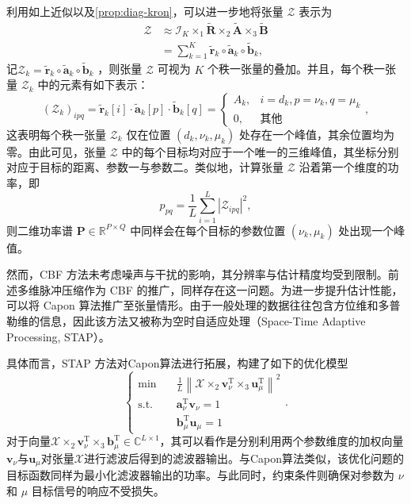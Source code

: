 利用如上近似以及\cref{prop:diag-kron}，可以进一步地将张量 \( \mathcal{Z} \) 表示为
\[
\begin{split}
    \mathcal{Z} 
    & \approx \mathcal{I}_K \times_1 \tilde{\mathbf{R}} \times_2 \tilde{\mathbf{A}} \times_3 \tilde{\mathbf{B}} \\
    & = \sum_{k=1}^K \tilde{\bm{r}}_k \circ \tilde{\bm{a}}_k \circ \tilde{\bm{b}}_k,
\end{split}
\]
记\( \mathcal{Z}_k = \tilde{\bm{r}}_k \circ \tilde{\bm{a}}_k \circ \tilde{\bm{b}}_k \) ，则张量 \( \mathcal{Z} \) 可视为 \( K \) 个秩一张量的叠加。并且，每个秩一张量 \( \mathcal{Z}_k \) 中的元素有如下表示：
\[
    (\mathcal{Z}_k)_{ipq} =  \tilde{\bm{r}}_k[i] \cdot \tilde{\bm{a}}_k[p] \cdot \tilde{\bm{b}}_k[q] = \begin{cases}
        A_k, & i = d_k, p = \nu_k, q = \mu_k \\
        0,   & \text{其他}
    \end{cases},
\]
这表明每个秩一张量 \( \mathcal{Z}_k \) 仅在位置 \( (d_k, \nu_k, \mu_k) \) 处存在一个峰值，其余位置均为零。由此可见，张量 \( \mathcal{Z} \) 中的每个目标均对应于一个唯一的三维峰值，其坐标分别对应于目标的距离、参数一与参数二。类似地，计算张量 \( \mathcal{Z} \) 沿着第一个维度的功率，即
\[
    p_{pq} = \frac{1}{L} \sum_{i=1}^L |\mathcal{Z}_{ipq}|^2,
\]
则二维功率谱 \( \mathbf{P} \in \mathbb{R}^{P \times Q} \) 中同样会在每个目标的参数位置 \( (\nu_k, \mu_k) \) 处出现一个峰值。

然而，CBF 方法未考虑噪声与干扰的影响，其分辨率与估计精度均受到限制。前述多维脉冲压缩作为 CBF 的推广，同样存在这一问题。为进一步提升估计性能，可以将 Capon 算法推广至张量情形。由于一般处理的数据往往包含方位维和多普勒维的信息，因此该方法又被称为空时自适应处理（Space-Time Adaptive Processing, STAP）。

具体而言，STAP 方法对Capon算法进行拓展，构建了如下的优化模型
\[
    \begin{cases}
        \min \quad        & \frac{1}{L} \left\| \mathcal{X} \times_2 \bm{v}_{\nu}^{\mathrm{T}} \times_3 \bm{u}_{\mu}^{\mathrm{T}} \right\|^2                          \\
        \text{s.t.} \quad & \bm{a}^{\mathrm{T}}_{\nu} \bm{v}_{\nu} = 1 \\
                            & \bm{b}^{\mathrm{T}}_{\mu} \bm{u}_{\mu} = 1
    \end{cases}.
\]
对于向量\( \mathcal{X} \times_2 \bm{v}_{\nu}^{\mathrm{T}} \times_3 \bm{b}_{\mu}^{\mathrm{T}} \in \mathbb{C}^{L \times 1} \)，其可以看作是分别利用两个参数维度的加权向量\( \bm{v}_{\nu} \)与\( \bm{u}_{\mu} \)对张量\( \mathcal{X} \)进行滤波后得到的滤波器输出。与Capon算法类似，该优化问题的目标函数同样为最小化滤波器输出的功率。与此同时，约束条件则确保对参数为 \( \nu \) 和 \( \mu \) 目标信号的响应不受损失。


